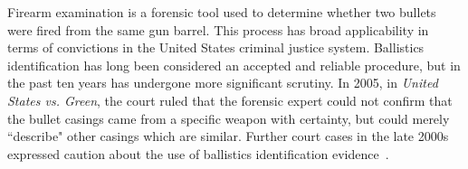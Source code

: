 \documentclass[aoas, preprint]{imsart}\usepackage[]{graphicx}\usepackage[]{color}
\begin{document}
Firearm examination is a forensic tool used to determine whether two bullets were fired from the same gun barrel. This process has broad applicability in terms of  convictions  in the United States criminal justice system. Ballistics identification has long been considered an accepted and reliable procedure, but in the past ten years has undergone more significant scrutiny. In 2005, in \emph{United States vs. Green}, the court ruled that the forensic expert could not confirm that the bullet casings came from a specific weapon with certainty, but could merely ``describe" other casings which are similar. Further court cases in the late 2000s expressed caution about the use of ballistics identification evidence~\citep{giannelli:2011}.
\end{document}
